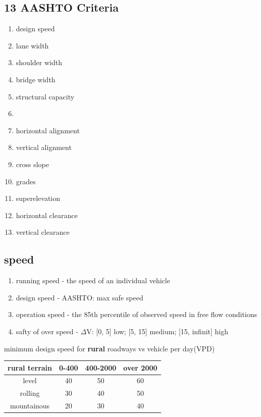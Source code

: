 \documentclass{article}
\begin{document}
  \subsection{13 AASHTO Criteria}
  \begin{enumerate}
      \item design speed
      \item lane width
      \item shoulder width
      \item bridge width
      \item structural capacity
      \item 
      \item horizontal alignment
      \item vertical alignment
      \item cross slope
      \item grades
      \item superelevation
      \item horizontal clearance
      \item vertical clearance
  \end{enumerate}

  \subsection{speed}
  \begin{enumerate}
    \item running speed - the speed of an individual vehicle
    \item design speed - AASHTO: max safe speed
    \item operation speed - the 85th percentile of observed speed in free flow conditions
    \item safty of over speed - $\Delta$V: [0, 5] low; [5, 15] medium; [15, infinit] high
  \end{enumerate}

  minimum design speed for \textbf{rural} roadways vs vehicle per day(VPD)
  \begin{tabular}{|c|c|c|c|}
    \hline
    rural terrain & 0-400 & 400-2000 & over 2000 \\
    \hline
    level         & 40    & 50       & 60 \\
    rolling       & 30    & 40       & 50 \\
    mountainous   & 20    & 30       & 40 \\
  \end{tabular}
\end{document}
